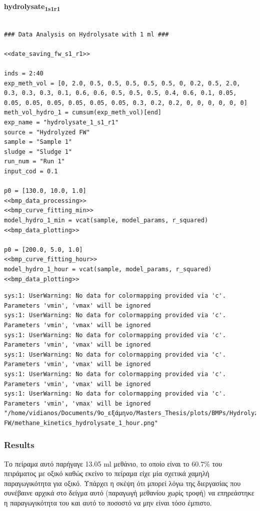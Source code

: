 \documentclass[11pt]{article}
\begin{document}
\textbf{hydrolysate\textsubscript{1}\textsubscript{s1}\textsubscript{r1}}
\begin{verbatim}

### Data Analysis on Hydrolysate with 1 ml ###

<<date_saving_fw_s1_r1>>

inds = 2:40
exp_meth_vol = [0, 2.0, 0.5, 0.5, 0.5, 0.5, 0.5, 0, 0.2, 0.5, 2.0, 0.3, 0.3, 0.3, 0.1, 0.6, 0.6, 0.5, 0.5, 0.5, 0.4, 0.6, 0.1, 0.05, 0.05, 0.05, 0.05, 0.05, 0.05, 0.05, 0.3, 0.2, 0.2, 0, 0, 0, 0, 0, 0]
meth_vol_hydro_1 = cumsum(exp_meth_vol)[end]
exp_name = "hydrolysate_1_s1_r1"
source = "Hydrolyzed FW"
sample = "Sample 1"
sludge = "Sludge 1"
run_num = "Run 1"
input_cod = 0.1

p0 = [130.0, 10.0, 1.0]
<<bmp_data_processing>>
<<bmp_curve_fitting_min>>
model_hydro_1_min = vcat(sample, model_params, r_squared)
<<bmp_data_plotting>>

p0 = [200.0, 5.0, 1.0]
<<bmp_curve_fitting_hour>>
model_hydro_1_hour = vcat(sample, model_params, r_squared)
<<bmp_data_plotting>>
\end{verbatim}

\begin{verbatim}
sys:1: UserWarning: No data for colormapping provided via 'c'. Parameters 'vmin', 'vmax' will be ignored
sys:1: UserWarning: No data for colormapping provided via 'c'. Parameters 'vmin', 'vmax' will be ignored
sys:1: UserWarning: No data for colormapping provided via 'c'. Parameters 'vmin', 'vmax' will be ignored
sys:1: UserWarning: No data for colormapping provided via 'c'. Parameters 'vmin', 'vmax' will be ignored
sys:1: UserWarning: No data for colormapping provided via 'c'. Parameters 'vmin', 'vmax' will be ignored
sys:1: UserWarning: No data for colormapping provided via 'c'. Parameters 'vmin', 'vmax' will be ignored
"/home/vidianos/Documents/9o_εξάμηνο/Masters_Thesis/plots/BMPs/Hydrolyzed FW/methane_kinetics_hydrolysate_1_hour.png"
\end{verbatim}

\subsubsection{Results}
\label{sec:orge13dc05}
Το πείραμα αυτό παρήγαγε 13.05 ml μεθάνιο, το οποίο είναι το \(60.7 \%\) του πειράματος με οξικό καθώς εκείνο το πείραμα είχε μία σχετικά χαμηλή παραγωγικότητα για οξικό. Υπάρχει η σκέψη ότι μπορεί λόγω της διεργασίας που συνέβαινε αρχικά στο δείγμα αυτό (παραγωγή μεθανίου χωρίς τροφή) να επηρεάστηκε η παραγωγικότητα του και αυτό το ποσοστό να μην είναι τόσο έμπιστο.
\end{document}
